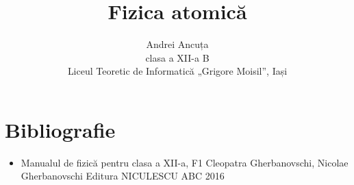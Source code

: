 \documentclass[a4paper, 12pt]{article}
\title{Fizica atomică}
\author{Andrei Ancuța \\ clasa a XII-a B \\
Liceul Teoretic de Informatică „Grigore Moisil”, Iași}
\def\\{}%
\newcommand{\mktitle}{%
    \noindent
    {\small\theauthor}

    \begin{center}
        \LARGE\thetitle
    \end{center}
}
\begin{document}
\mktitle
\tableofcontents

\clearpage




\clearpage

\section*{Bibliografie}
\begin{itemize}
    \item Manualul de fizică pentru clasa a XII-a, F1 \\
        Cleopatra Gherbanovschi, Nicolae Gherbanovschi \\
        Editura NICULESCU ABC \\
        2016
\end{itemize}
\end{document}
